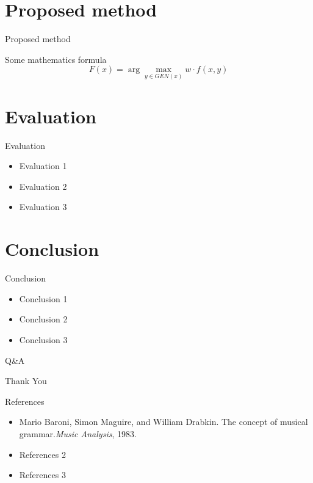 \documentclass[11pt]{beamer}
\newcommand{\argmax}{\arg\!\max}
\begin{document}
\section{Proposed method}
\begin{frame}{Proposed method}
 
Some mathematics formula $$F(x) = \argmax_{y \in GEN(x)} w \cdot f(x, y)$$
\end{frame}
 
\section{Evaluation}
\begin{frame}{Evaluation}
\begin{itemize}
\item Evaluation 1
\item Evaluation 2
\item Evaluation 3
\end{itemize}
\end{frame}
 
\section{Conclusion}
\begin{frame}{Conclusion}
\begin{itemize}
\item Conclusion 1
\item Conclusion 2
\item Conclusion 3
\end{itemize}
\end{frame}
 
\begin{frame}{Q\&A}
\begin{center}
\Huge Thank You
\end{center}
\end{frame}
 
\begin{frame}{References}
\begin{itemize}
\item Mario Baroni, Simon Maguire, and William Drabkin. The concept of musical grammar.\textit{Music Analysis}, 1983.
\item References 2
\item References 3
\end{itemize}
\end{frame}
\end{document}
